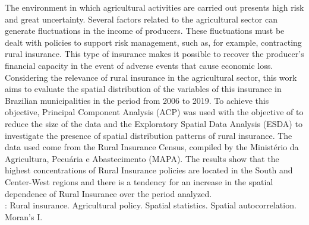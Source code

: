 The environment in which agricultural activities are carried out presents high risk and great uncertainty. Several factors related to the agricultural sector can generate fluctuations in the income of producers. These fluctuations must be dealt with policies to support risk management, such as, for example, contracting rural insurance. This type of insurance makes it possible to recover the producer's financial capacity in the event of adverse events that cause economic loss. Considering the relevance of rural insurance in the agricultural sector, this work aims to evaluate the spatial distribution of the variables of this insurance in Brazilian municipalities in the period from 2006 to 2019. To achieve this objective, Principal Component Analysis (ACP) was used with the objective of to reduce the size of the data and the Exploratory Spatial Data Analysis (ESDA) to investigate the presence of spatial distribution patterns of rural insurance. The data used come from the Rural Insurance Census, compiled by the Ministério da Agricultura, Pecuária e Abastecimento (MAPA). The results show that the highest concentrations of Rural Insurance policies are located in the South and Center-West regions and there is a tendency for an increase in the spatial dependence of Rural Insurance over the period analyzed. \\
\newline
{}: Rural insurance. Agricultural policy. Spatial statistics. Spatial autocorrelation. Moran's I.
